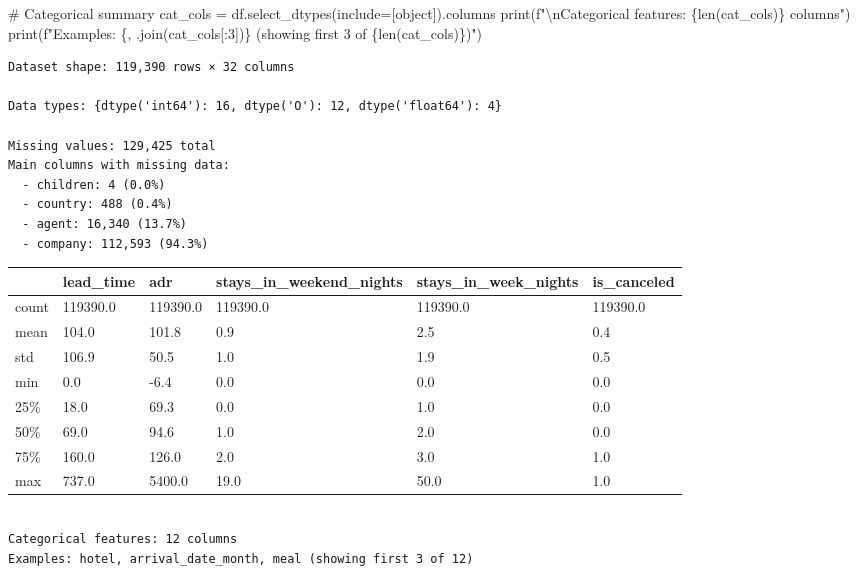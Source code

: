 \documentclass[
  letterpaper,
  DIV=11,
  numbers=noendperiod]{scrartcl}
\newenvironment{Shaded}{\begin{snugshade}}{\end{snugshade}}
\newcommand{\BuiltInTok}[1]{\textcolor[rgb]{0.00,0.23,0.31}{#1}}
\newcommand{\CharTok}[1]{\textcolor[rgb]{0.13,0.47,0.30}{#1}}
\newcommand{\CommentTok}[1]{\textcolor[rgb]{0.37,0.37,0.37}{#1}}
\newcommand{\DecValTok}[1]{\textcolor[rgb]{0.68,0.00,0.00}{#1}}
\newcommand{\NormalTok}[1]{\textcolor[rgb]{0.00,0.23,0.31}{#1}}
\newcommand{\OperatorTok}[1]{\textcolor[rgb]{0.37,0.37,0.37}{#1}}
\newcommand{\SpecialCharTok}[1]{\textcolor[rgb]{0.37,0.37,0.37}{#1}}
\newcommand{\SpecialStringTok}[1]{\textcolor[rgb]{0.13,0.47,0.30}{#1}}
\newcommand{\StringTok}[1]{\textcolor[rgb]{0.13,0.47,0.30}{#1}}
\renewenvironment{Shaded}{%
  \begin{tcolorbox}[%
    enhanced,%
    colback=codebg,%
    colframe=codebg,%
    borderline west={3pt}{0pt}{sectionblue},%
    fontupper=\small\ttfamily,%
    boxrule=0pt,%
    arc=0pt,%
    boxsep=5pt,%
    left=2mm,%
    right=2mm,%
    top=2mm,%
    bottom=2mm%
  ]%
}{%
  \end{tcolorbox}%
}
\begin{document}
\begin{Shaded}
\begin{Highlighting}[]
\CommentTok{\# Categorical summary}
\NormalTok{cat\_cols }\OperatorTok{=}\NormalTok{ df.select\_dtypes(include}\OperatorTok{=}\NormalTok{[}\StringTok{\textquotesingle{}object\textquotesingle{}}\NormalTok{]).columns}
\BuiltInTok{print}\NormalTok{(}\SpecialStringTok{f"}\CharTok{\textbackslash{}n}\SpecialStringTok{Categorical features: }\SpecialCharTok{\{}\BuiltInTok{len}\NormalTok{(cat\_cols)}\SpecialCharTok{\}}\SpecialStringTok{ columns"}\NormalTok{)}
\BuiltInTok{print}\NormalTok{(}\SpecialStringTok{f"Examples: }\SpecialCharTok{\{}\StringTok{\textquotesingle{}, \textquotesingle{}}\SpecialCharTok{.}\NormalTok{join(cat\_cols[:}\DecValTok{3}\NormalTok{])}\SpecialCharTok{\}}\SpecialStringTok{ (showing first 3 of }\SpecialCharTok{\{}\BuiltInTok{len}\NormalTok{(cat\_cols)}\SpecialCharTok{\}}\SpecialStringTok{)"}\NormalTok{)}
\end{Highlighting}
\end{Shaded}

\begin{verbatim}
Dataset shape: 119,390 rows × 32 columns

Data types: {dtype('int64'): 16, dtype('O'): 12, dtype('float64'): 4}

Missing values: 129,425 total
Main columns with missing data:
  - children: 4 (0.0%)
  - country: 488 (0.4%)
  - agent: 16,340 (13.7%)
  - company: 112,593 (94.3%)
\end{verbatim}

\begin{longtable}[]{@{}llllll@{}}
\toprule\noalign{}
& lead\_time & adr & stays\_in\_weekend\_nights &
stays\_in\_week\_nights & is\_canceled \\
\midrule\noalign{}
\endhead
\bottomrule\noalign{}
\endlastfoot
count & 119390.0 & 119390.0 & 119390.0 & 119390.0 & 119390.0 \\
mean & 104.0 & 101.8 & 0.9 & 2.5 & 0.4 \\
std & 106.9 & 50.5 & 1.0 & 1.9 & 0.5 \\
min & 0.0 & -6.4 & 0.0 & 0.0 & 0.0 \\
25\% & 18.0 & 69.3 & 0.0 & 1.0 & 0.0 \\
50\% & 69.0 & 94.6 & 1.0 & 2.0 & 0.0 \\
75\% & 160.0 & 126.0 & 2.0 & 3.0 & 1.0 \\
max & 737.0 & 5400.0 & 19.0 & 50.0 & 1.0 \\
\end{longtable}

\begin{verbatim}

Categorical features: 12 columns
Examples: hotel, arrival_date_month, meal (showing first 3 of 12)
\end{verbatim}
\end{document}

